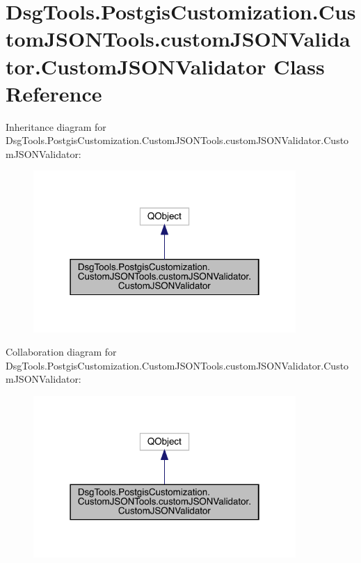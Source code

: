 \hypertarget{class_dsg_tools_1_1_postgis_customization_1_1_custom_j_s_o_n_tools_1_1custom_j_s_o_n_validator_1_1_custom_j_s_o_n_validator}{}\section{Dsg\+Tools.\+Postgis\+Customization.\+Custom\+J\+S\+O\+N\+Tools.\+custom\+J\+S\+O\+N\+Validator.\+Custom\+J\+S\+O\+N\+Validator Class Reference}
\label{class_dsg_tools_1_1_postgis_customization_1_1_custom_j_s_o_n_tools_1_1custom_j_s_o_n_validator_1_1_custom_j_s_o_n_validator}


Inheritance diagram for Dsg\+Tools.\+Postgis\+Customization.\+Custom\+J\+S\+O\+N\+Tools.\+custom\+J\+S\+O\+N\+Validator.\+Custom\+J\+S\+O\+N\+Validator\+:
\nopagebreak
\begin{figure}[H]
\begin{center}
\leavevmode
\includegraphics[width=283pt]{class_dsg_tools_1_1_postgis_customization_1_1_custom_j_s_o_n_tools_1_1custom_j_s_o_n_validator_17cb86a26da657342dee62b27743de98d}
\end{center}
\end{figure}


Collaboration diagram for Dsg\+Tools.\+Postgis\+Customization.\+Custom\+J\+S\+O\+N\+Tools.\+custom\+J\+S\+O\+N\+Validator.\+Custom\+J\+S\+O\+N\+Validator\+:
\nopagebreak
\begin{figure}[H]
\begin{center}
\leavevmode
\includegraphics[width=283pt]{class_dsg_tools_1_1_postgis_customization_1_1_custom_j_s_o_n_tools_1_1custom_j_s_o_n_validator_1579a5d591b9d298f985daeeeca77b8f1}
\end{center}
\end{figure}
